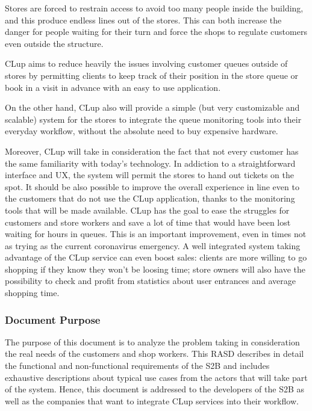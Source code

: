 Stores are forced to restrain access to avoid too many people inside the building,
and this produce endless lines out of the stores. This can both increase the danger for people waiting for their turn and force the shops to regulate customers even outside the structure.

\medskip

CLup aims to reduce heavily the issues involving customer queues outside of stores by permitting clients to keep track of their position in the store queue or book in a visit in advance with an easy to use application.

\medskip

On the other hand, CLup also will provide a simple (but very customizable and scalable) system for the stores to integrate the queue monitoring tools into their everyday workflow, without the absolute need to buy expensive hardware.

\medskip

Moreover, CLup will take in consideration the fact that not every customer has the same familiarity with today's technology.
In addiction to a straightforward interface and UX, the system will permit the stores to hand out tickets on the spot. It should be also possible to improve the overall experience in line even to the customers that do not use the CLup application, thanks to the monitoring tools that will be made available.
\medskip
CLup has the goal to ease the struggles for customers and store workers and save a lot of time that would have been lost waiting for hours in queues. This is an important improvement, even in times not as trying as the current coronavirus emergency.
A well integrated system taking advantage of the CLup service can even boost sales: clients are more willing to go shopping if they know they won't be loosing time; store owners will also have the possibility to check and profit from statistics about user entrances and average shopping time.

\subsubsection{Document Purpose}

The purpose of this document is to analyze the problem taking in consideration the real needs of the customers and shop workers.
This RASD describes in detail the functional and non-functional requirements of the S2B and includes exhaustive descriptions about typical use cases from the actors that will take part of the system.
Hence, this document is addressed to the developers of the S2B as well as the companies that want to integrate CLup services into their workflow.

